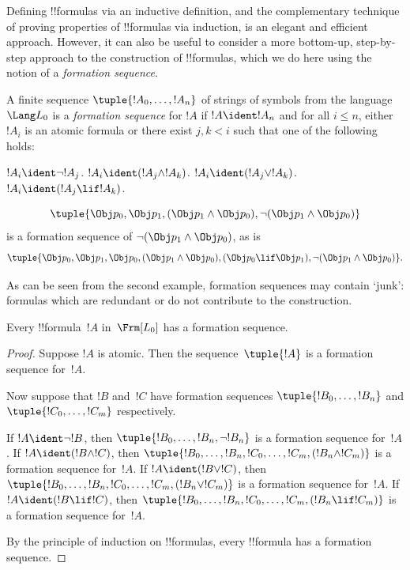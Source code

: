 
Defining !!{formula}s via an inductive definition, and the
complementary technique of proving properties of !!{formula}s via
induction, is an elegant and efficient approach. However, it can
also be useful to consider a more bottom-up, step-by-step approach
to the construction of !!{formula}s, which we do here using the
notion of a \emph{formation sequence}.

\begin{defn}
A finite sequence $\tuple{!A_0,\dotsc,!A_n}$ of strings of
symbols from the language~$\Lang L_0$ is a \emph{formation
sequence} for $!A$ if $!A \ident !A_n$ and for all $i \leq n$,
either $!A_i$ is an atomic formula or there exist $j,k < i$
such that one of the following holds:
\begin{enumerate}
    $!A_i \ident \lnot !A_j$.
    $!A_i \ident (!A_j \land !A_k)$.
    $!A_i \ident (!A_j \lor !A_k)$.
    $!A_i \ident (!A_j \lif !A_k)$.
    
\end{enumerate}
\end{defn}

\begin{ex}
\[
\tuple{
    \Obj p_0,
    \Obj p_1,
    (\Obj p_1 \land \Obj p_0),
    \lnot (\Obj p_1 \land \Obj p_0)
}
\]
is a formation sequence of
$\lnot (\Obj p_1 \land \Obj p_0)$, as is
\[
\tuple{
    \Obj p_0,
    \Obj p_1,
    \Obj p_0,
    (\Obj p_1 \land \Obj p_0),
    (\Obj p_0 \lif \Obj p_1),
    \lnot (\Obj p_1 \land \Obj p_0)
}.
\]

As can be seen from the second example, formation sequences
may contain `junk': formulas which are redundant or do not
contribute to the construction.
\end{ex}

\begin{prop}
Every !!{formula}~$!A$ in~$\Frm[L_0]$ has a formation sequence.
\end{prop}

\begin{proof}
Suppose $!A$ is atomic. Then the sequence~$\tuple{!A}$ is a
formation sequence for~$!A$.

Now suppose that $!B$ and~$!C$ have formation sequences
$\tuple{!B_0,\dotsc,!B_n}$ and $\tuple{!C_0,\dotsc,!C_m}$
respectively.

\begin{enumerate}
  If $!A \ident \lnot !B$,
      then $\tuple{!B_0,\dotsc,!B_n,\lnot !B_n}$
      is a formation sequence for~$!A$.
  If $!A \ident (!B \land !C)$,
      then $\tuple{!B_0,\dotsc,!B_n,!C_0,\dotsc,!C_m,(!B_n \land !C_m)}$
      is a formation sequence for~$!A$.
  If $!A \ident (!B \lor !C)$,
      then $\tuple{!B_0,\dotsc,!B_n,!C_0,\dotsc,!C_m,(!B_n \lor !C_m)}$
      is a formation sequence for~$!A$.
  If $!A \ident (!B \lif !C)$,
      then $\tuple{!B_0,\dotsc,!B_n,!C_0,\dotsc,!C_m,(!B_n \lif !C_m)}$
      is a formation sequence for~$!A$.
  
\end{enumerate}
By the principle of induction on !!{formula}s,
every !!{formula} has a formation sequence.
\end{proof}

